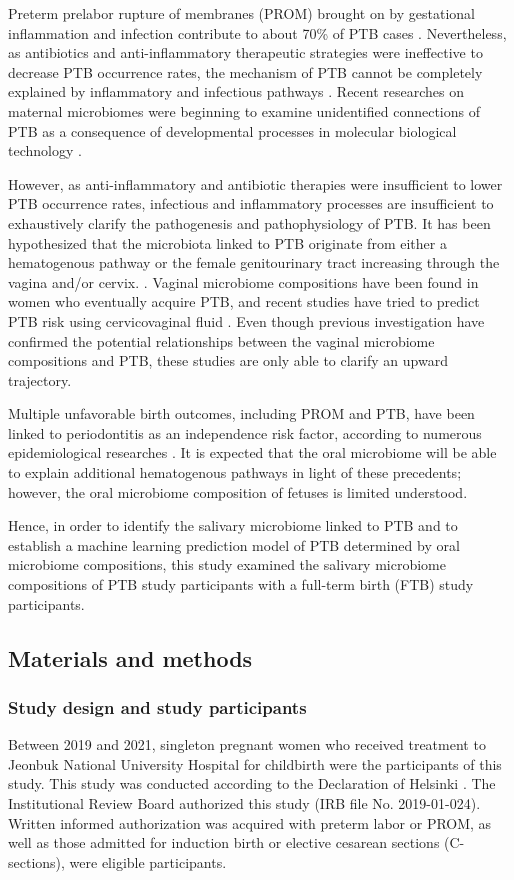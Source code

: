 \documentclass[11pt, a4paper, onecolumn, oneside]{report}
\begin{document}
            Preterm prelabor rupture of membranes (PROM) brought on by gestational inflammation and infection contribute to about 70\% of PTB cases \cite{PTB-prediction-5}. Nevertheless, as antibiotics and anti-inflammatory therapeutic strategies were ineffective to decrease PTB occurrence rates, the mechanism of PTB cannot be completely explained by inflammatory and infectious pathways \cite{PTB-mechanism-1}. Recent researches on maternal microbiomes were beginning to examine unidentified connections of PTB as a consequence of developmental processes in molecular biological technology \cite{PTB-mechanism-2}.

            However, as anti-inflammatory and antibiotic therapies were insufficient to lower PTB occurrence rates, infectious and inflammatory processes are insufficient to exhaustively clarify the pathogenesis and pathophysiology of PTB. It has been hypothesized that the microbiota linked to PTB originate from either a hematogenous pathway or the female genitourinary tract increasing through the vagina and/or cervix. \cite{PTB-mechanism-3}. Vaginal microbiome compositions have been found in women who eventually acquire PTB, and recent studies have tried to predict PTB risk using cervicovaginal fluid \cite{PTB-mechanism-4}. Even though previous investigation have confirmed the potential relationships between the vaginal microbiome compositions and PTB, these studies are only able to clarify an upward trajectory.

            Multiple unfavorable birth outcomes, including PROM and PTB, have been linked to periodontitis as an independence risk factor, according to numerous epidemiological researches \cite{PTB-mechanism-5}. It is expected that the oral microbiome will be able to explain additional hematogenous pathways in light of these precedents; however, the oral microbiome composition of fetuses is limited understood.

            Hence, in order to identify the salivary microbiome linked to PTB and to establish a machine learning prediction model of PTB determined by oral microbiome compositions, this study examined the salivary microbiome compositions of PTB study participants with a full-term birth (FTB) study participants.
        \newpage

        \subsection{Materials and methods}
            \subsubsection{Study design and study participants}
                Between 2019 and 2021, singleton pregnant women who received treatment to Jeonbuk National University Hospital for childbirth were the participants of this study. This study was conducted according to the Declaration of Helsinki \cite{Helsinki-1}. The Institutional Review Board authorized this study (IRB file No. 2019-01-024). Written informed authorization was acquired with preterm labor or PROM, as well as those admitted for induction birth or elective cesarean sections (C-sections), were eligible participants.
\end{document}
